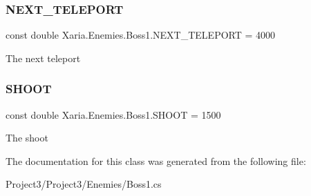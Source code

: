 \subsubsection{\texorpdfstring{N\+E\+X\+T\+\_\+\+T\+E\+L\+E\+P\+O\+RT}{NEXT\_TELEPORT}}
{\footnotesize\ttfamily const double Xaria.\+Enemies.\+Boss1.\+N\+E\+X\+T\+\_\+\+T\+E\+L\+E\+P\+O\+RT = 4000\hspace{0.3cm}{\ttfamily [private]}}



The next teleport 

\mbox{\label{classXaria_1_1Enemies_1_1Boss1_ab4e7aea397f0d4d722c7cac36bf40197}} 
\subsubsection{\texorpdfstring{S\+H\+O\+OT}{SHOOT}}
{\footnotesize\ttfamily const double Xaria.\+Enemies.\+Boss1.\+S\+H\+O\+OT = 1500\hspace{0.3cm}{\ttfamily [private]}}



The shoot 



The documentation for this class was generated from the following file\+:\begin{DoxyCompactItemize}
\item 
Project3/\+Project3/\+Enemies/Boss1.\+cs\end{DoxyCompactItemize}
